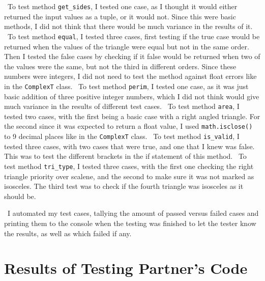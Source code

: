 \documentclass[12pt]{article}
\begin{document}
~\newline\noindent To test method \verb|get_sides|, I tested one case, as I thought it would either returned the input values as a tuple, or it would not. Since this were basic methods, I did not think that there would be much variance 
in the results of it. 
~\newline\noindent To test method \verb|equal|, I tested three cases, first testing if the true case would be returned when the values of the triangle were equal but not in the same order. Then I tested the false cases by checking if it false would be returned when two of the values were the same, but not the third in different orders. Since these numbers were integers, I did not need to test the method against float errors like in the \verb|ComplexT| class. 
~\newline\noindent To test method \verb|perim|, I tested one case, as it 
was just basic addition of three positive integer numbers, which I did not think 
would give much variance in the results of different test cases. 
~\newline\noindent To test method \verb|area|, I tested two cases, with the first being a basic case with a right angled triangle. For the second since it was expected to return a float value, I used \verb|math.isclose()| to 9 decimal places like in the \verb|ComplexT| class. 
~\newline\noindent To test method \verb|is_valid|, I tested three cases, with two cases that were true, and one that I knew was false. This was to test the different brackets in the if statement of this method. 
~\newline\noindent To test method \verb|tri_type|, I tested three cases, with the first one checking the right triangle priority over scalene, and the second to make sure it was not marked as isosceles. The third test was to check if the fourth triangle was isosceles as it should be. 

~\newline\noindent I automated my test cases, tallying the amount of passed versus failed cases and printing them to the console when the testing was finished to let the tester know the results, as well as which failed if any. 

\section{Results of Testing Partner's Code}
\end{document}
